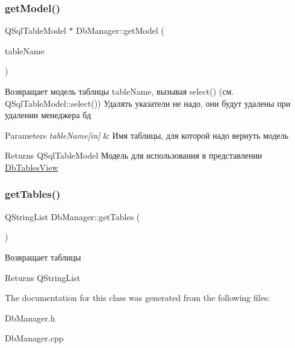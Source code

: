 \subsubsection{\texorpdfstring{get\+Model()}{getModel()}}
{\footnotesize\ttfamily Q\+Sql\+Table\+Model $\ast$ Db\+Manager\+::get\+Model (\begin{DoxyParamCaption}\item[{const Q\+String \&}]{table\+Name }\end{DoxyParamCaption})}



Возвращает модель таблицы table\+Name, вызывая select() (см. Q\+Sql\+Table\+Model\+::select()) Удалять указатели не надо, они будут удалены при удалении менеджера бд 


\begin{DoxyParams}{Parameters}
{\em table\+Name\mbox{[}in\mbox{]}} & Имя таблицы, для которой надо вернуть модель \\
\hline
\end{DoxyParams}
\begin{DoxyReturn}{Returns}
Q\+Sql\+Table\+Model Модель для использования в представлении \mbox{\hyperlink{class_db_tables_view}{Db\+Tables\+View}} 
\end{DoxyReturn}
\mbox{\label{class_db_manager_a56efe9d49dc68dcdef05ae834f7618b0}} 
\subsubsection{\texorpdfstring{get\+Tables()}{getTables()}}
{\footnotesize\ttfamily Q\+String\+List Db\+Manager\+::get\+Tables (\begin{DoxyParamCaption}{ }\end{DoxyParamCaption})}



Возвращает таблицы 

\begin{DoxyReturn}{Returns}
Q\+String\+List 
\end{DoxyReturn}


The documentation for this class was generated from the following files\+:\begin{DoxyCompactItemize}
\item 
Db\+Manager.\+h\item 
Db\+Manager.\+cpp\end{DoxyCompactItemize}
